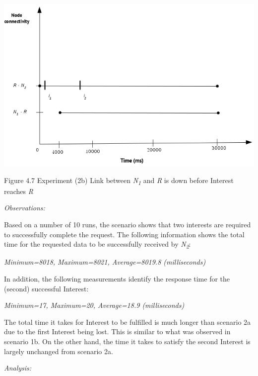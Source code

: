 \documentclass[a4paper,12pt]{report}      %
\begin{document}
\noindent\includegraphics[scale=0.55]{exp2b_timediag.jpg}\newline
\begin{center}Figure 4.7 Experiment (2b) Link between \emph{N\textsubscript{1}} and \emph{R} is down before Interest reaches \emph{R}\end{center}

\vspace*{1\baselineskip}\noindent\emph{Observations:}

Based on a number of 10 runs, the scenario shows that two interests are required to successfully
complete the request. The following information shows the total time for the requested data to be
successfully received by  \emph{N\textsubscript{2}}:

\begin{center}\textsl{Minimum=8018, Maximum=8021, Average=8019.8 (milliseconds)}\end{center}

In addition, the following measurements identify the response time for the (second) successful Interest:

\begin{center}\textsl{Minimum=17, Maximum=20, Average=18.9 (milliseconds)}\end{center}

The total time it takes for Interest to be fulfilled is much longer than scenario 2a due to the first Interest being lost. This is similar to what was observed in scenario 1b. On the other hand, the time it takes to satisfy the second Interest is largely unchanged from scenario 2a. 

\vspace*{1\baselineskip}\noindent\emph{Analysis:}
\end{document}
